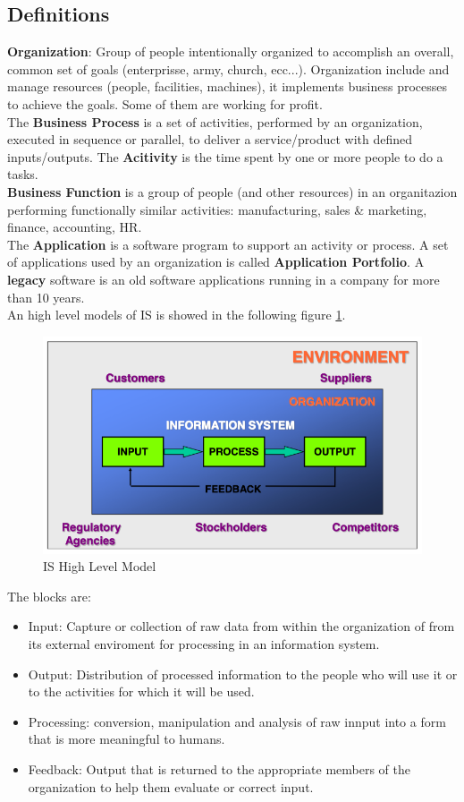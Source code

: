 \documentclass[12pt]{article}
\begin{document}
\subsection{Definitions}
\textbf{Organization}: Group of people intentionally organized to accomplish an overall, common set of goals (enterprisse, army, church, ecc...). Organization include and manage resources (people, facilities, machines), it implements business processes to achieve the goals. Some of them are working for profit.\\
The \textbf{Business Process} is a set of activities, performed by an organization, executed in sequence or parallel, to deliver a service/product with defined inputs/outputs. The \textbf{Acitivity} is the time spent by one or more people to do a tasks.\\
\textbf{Business Function} is a group of people (and other resources) in an organitazion performing functionally similar activities: manufacturing, sales \& marketing, finance, accounting, HR.\\
The \textbf{Application} is a software program to support an activity or process. A set of applications used by an organization is called \textbf{Application Portfolio}. A \textbf{legacy} software is an old software applications running in a company for more than 10 years.\\
An high level models of IS is showed in the following figure \ref{fig:IS_HLM}.
\begin{figure}[H]
  \includegraphics[width=\linewidth]{images/IS_HLM.png}
  \caption{IS High Level Model}
  \label{fig:IS_HLM}
\end{figure}
The blocks are:
\begin{itemize}
  \item Input: Capture or collection of raw data from within the organization of from its external enviroment for processing in an information system.
  \item Output: Distribution of processed information to the people who will use it or to the activities for which it will be used.
  \item Processing: conversion, manipulation and analysis of raw innput into a form that is more meaningful to humans.
  \item Feedback: Output that is returned to the appropriate members of the organization to help them evaluate or correct input.
\end{itemize}
\end{document}
